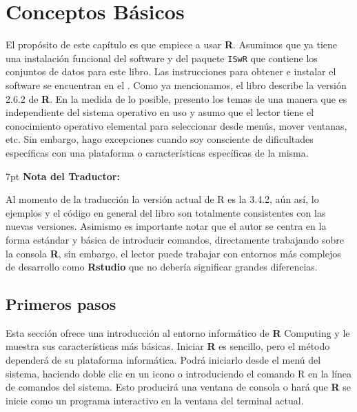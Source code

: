 \documentclass[spanish]{extbook}
\newenvironment{tradnote}{%
  \def\FrameCommand{%
    \hspace{1pt}%
    {\color{darkblue}\vrule width 2pt}%
    {\color{formalshade}\vrule width 4pt}%
    \colorbox{formalshade}%
  }%
  \vspace{12pt}
  \MakeFramed{\advance\hsize-\width\FrameRestore}%
  \noindent\hspace{-4.55pt}%
  \begin{adjustwidth}{}{7pt}%
  \vspace{1pt}%
  \textbf{Nota del Traductor:\\}%
}
{%
  \vspace{6pt}\end{adjustwidth}\endMakeFramed%
}
\numberwithin{equation}{section}
\numberwithin{figure}{section}
\begin{document}
\cleardoublepage
{}
\tableofcontents


\chapter{Conceptos Básicos}

El propósito de este capítulo es que empiece a usar  \textbf{R}.  Asumimos que
ya tiene una instalación funcional del software y del paquete \texttt{ISwR} que
contiene los conjuntos de datos para este libro. Las instrucciones para obtener
e instalar el software se encuentran en el . Como ya
mencionamos, el libro describe la versión 2.6.2 de  \textbf{R}.  En la medida
de lo posible, presento los temas de una manera que es independiente del
sistema operativo en uso y asumo que el lector tiene el conocimiento operativo
elemental para seleccionar desde menús, mover ventanas, etc. Sin embargo, hago
excepciones cuando soy consciente de dificultades específicas con una
plataforma o características específicas de la misma.

\begin{tradnote} 
	Al momento de la traducción la versión actual de R es la
	3.4.2, aún así, lo ejemplos y el código en general del libro son totalmente
	consistentes con las nuevas versiones. Asimismo es importante notar que el
	autor se centra en la forma estándar y básica de introducir comandos,
	directamente trabajando sobre la consola \textbf{R}, sin embargo, el lector
	puede trabajar con entornos más complejos de desarrollo como
	\textbf{Rstudio} que no debería significar grandes diferencias.
\end{tradnote} \newpage

\section{Primeros pasos}

Esta sección ofrece una introducción al entorno informático de  \textbf{R}
Computing y le muestra sus características más básicas. Iniciar  \textbf{R} es
sencillo, pero el método dependerá de su plataforma informática.  Podrá
iniciarlo desde el menú del sistema, haciendo doble clic en un icono o
introduciendo el comando \textquotedbl{}R\textquotedbl{} en la línea de
comandos del sistema. Esto producirá una ventana de consola o hará que
\textbf{R} se inicie como un programa interactivo en la ventana del terminal
actual. 
\end{document}
